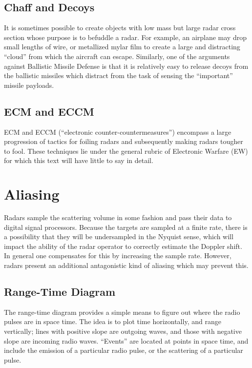 \subsection{Chaff and Decoys} 

It is sometimes possible to create objects with low mass but large
radar cross section whose purpose is to befuddle a radar.  For
example, an airplane may drop small lengths of wire, or metallized
mylar film to create a large and distracting ``cloud'' from which the
aircraft can escape.  Similarly, one of the arguments against
Ballistic Missile Defense is that it is relatively easy to release
decoys from the ballistic missiles which distract from the task of
sensing the ``important'' missile payloads.

\subsection{ECM and ECCM} 

 
 

ECM and ECCM (``electronic counter-countermeasures'') encompass a large
progression of tactics for foiling radars and subsequently making
radars tougher to fool.  These techniques lie under the general rubric
of Electronic Warfare (EW) for which this text will have little to
say in detail.


\section{Aliasing}

Radars sample the scattering volume in some fashion and pass their
data to digital signal processors.  Because the targets are sampled at
a finite rate, there is a possibility that they will be undersampled
in the Nyquist sense, which will impact the ability of the radar
operator to correctly estimate the Doppler shift.  In general one
compensates for this by increasing the sample rate.  However, radars
present an additional antagonistic kind of aliasing which may prevent
this.

\subsection{Range-Time Diagram}

The range-time diagram provides a simple means to figure out where the
radio pulses are in space time.  The idea is to plot time
horizontally, and range vertically; lines with positive slope are
outgoing waves, and those with negative slope are incoming radio
waves.  ``Events'' are located at points in space time, and include
the emission of a particular radio pulse, or the scattering of a
particular pulse.

